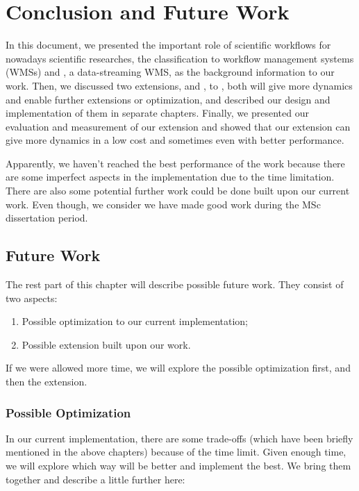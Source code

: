 \chapter{Conclusion and Future Work}
In this document, we presented the important role of scientific workflows for nowadays scientific researches, the classification to workflow management systems (WMSs) and \dpy, a data-streaming WMS, as the background information to our work. Then, we discussed two extensions, \tincdep and \tdynexp, to \dpy, both will give \dpy more dynamics and enable further extensions or optimization, and described our design and implementation of them in separate chapters. Finally, we presented our evaluation and measurement of our extension and showed that our extension can give \dpy more dynamics in a low cost and sometimes even with better performance.

Apparently, we haven't reached the best performance of the work because there are some imperfect aspects in the implementation due to the time limitation. There are also some potential further work could be done built upon our current work. Even though, we consider we have made good work during the MSc dissertation period.

\section{Future Work}
The rest part of this chapter will describe possible future work. They consist of two aspects:
\begin{enumerate}
	\item Possible optimization to our current implementation;
	\item Possible extension built upon our work.
\end{enumerate}

If we were allowed more time, we will explore the possible optimization first, and then the extension.

\subsection{Possible Optimization}
In our current implementation, there are some trade-offs (which have been briefly mentioned in the above chapters) because of the time limit. Given enough time, we will explore which way will be better and implement the best. We bring them together and describe a little further here:

